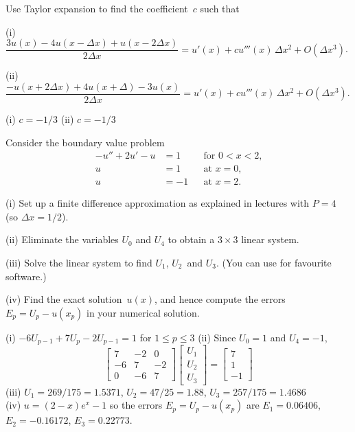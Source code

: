 \begin{Exercises}
\exercise
Use Taylor expansion to find the coefficient~$c$ such that
\begin{description}
\item{(i)} $\dfrac{3u(x)-4u(x-\Delta x)+u(x-2\Delta x)}{2\Delta x}
=u'(x)+cu'''(x)\,\Delta x^2+O(\Delta x^3)$.
\item{(ii)} $\dfrac{-u(x+2\Delta x)+4u(x+\Delta)-3u(x)}{2\Delta x}
=u'(x)+cu'''(x)\,\Delta x^2+O(\Delta x^3)$.
\end{description}
\begin{ans}
(i) $c=-1/3$ \quad(ii) $c=-1/3$
\end{ans}

\exercise
Consider the boundary value problem
\[
\begin{aligned}
-u''+2u'-u&=1&&\text{for $0<x<2$,}\\
u&=1&&\text{at $x=0$,}\\
u&=-1&&\text{at $x=2$.}
\end{aligned}
\]
\begin{description}
\item{(i)}
Set up a finite difference approximation as explained in lectures
with $P=4$ (so $\Delta x=1/2$).
\item{(ii)}
Eliminate the variables $U_0$ and $U_4$ to obtain a $3\times3$ linear
system.
\item{(iii)}
Solve the linear system to find $U_1$, $U_2$~and $U_3$.  (You can use
for favourite software.)
\item{(iv)}
Find the exact solution~$u(x)$, and hence compute the errors~$E_p=U_p-u(x_p)$ 
in your numerical solution.
\end{description}
\begin{ans}
(i) $-6U_{p-1}+7U_p-2U_{p-1}=1$ for $1\le p\le3$\quad
(ii) Since $U_0=1$ and $U_4=-1$,
\[
\begin{bmatrix}7&-2& 0\\ -6& 7&-2\\  0&-6& 7\end{bmatrix}
\begin{bmatrix}U_1\\ U_2\\ U_3\end{bmatrix}
=\begin{bmatrix}7\\ 1\\ -1\end{bmatrix}
\]
(iii) $U_1=269/175=1.5371$, $U_2=47/25=1.88$,
$U_3=257/175=1.4686$\\
(iv) $u=(2-x)e^x-1$ so the errors $E_p=U_p-u(x_p)$ are
$E_1=0.06406$, $E_2=-0.16172$, $E_3=0.22773$.
\end{ans}


\end{Exercises}
